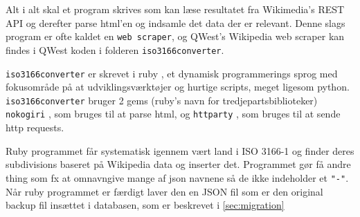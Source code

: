 Alt i alt skal et program skrives som kan læse resultatet fra Wikimedia's REST API og derefter parse html'en og indsamle det data der er relevant. 
Denne slags program er ofte kaldet en \texttt{web scraper}, og QWest's Wikipedia web scraper kan findes i QWest koden i folderen \texttt{iso3166converter}.

\texttt{iso3166converter} er skrevet i ruby \cite{RubyLang}, et dynamisk programmerings sprog med fokusområde på at udviklingsværktøjer og hurtige scripts, meget ligesom python. \texttt{iso3166converter} bruger 2 gems (ruby's navn for tredjepartsbiblioteker) \texttt{nokogiri} \cite{nokogiri}, som bruges til at parse html, og \texttt{httparty} \cite{httparty}, som bruges til at sende http requests.

Ruby programmet får systematisk igennem vært land i ISO 3166-1 og finder deres subdivisions baseret på Wikipedia data og inserter det. Programmet gør få andre thing som fx at omnavngive mange af json navnene så de ikke indeholder et \texttt{"-"}. Når ruby programmet er færdigt laver den en JSON fil som er den original backup fil insættet i databasen, som er beskrevet i \ref{sec:migration}